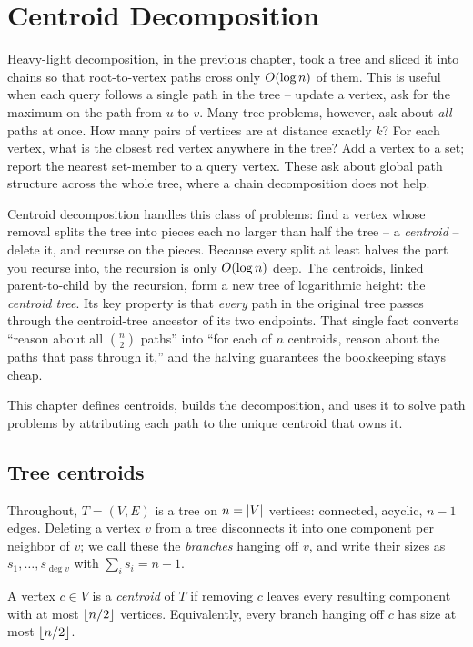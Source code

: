\chapter{Centroid Decomposition}

Heavy-light decomposition, in the previous chapter, took a tree and sliced it into
chains so that root-to-vertex paths cross only $O(\log n)$ of them. This is useful when each query follows a single path in the tree -- update a vertex, ask
for the maximum on the path from $u$ to $v$. Many tree problems, however, ask
about \emph{all} paths at once. How many pairs
of vertices are at distance exactly $k$? For each vertex, what is the closest red
vertex anywhere in the tree? Add a vertex to a set; report the nearest set-member
to a query vertex. These ask about global path structure across the whole tree, where a
chain decomposition does not help.

Centroid decomposition handles this class of problems:
find a vertex whose removal splits the tree into pieces each no larger than half
the tree -- a \emph{centroid} -- delete it, and recurse on the pieces. Because
every split at least halves the part you recurse into, the recursion is only
$O(\log n)$ deep. The centroids, linked parent-to-child by the recursion, form a
new tree of logarithmic height: the \emph{centroid tree}. Its key property is
that \emph{every} path in the original tree passes through the centroid-tree
ancestor of its two endpoints. That single fact converts ``reason about all
$\binom{n}{2}$ paths'' into ``for each of $n$ centroids, reason about the paths
that pass through it,'' and the halving guarantees the bookkeeping stays cheap.

This chapter defines centroids, builds the decomposition, and uses it to solve path problems by attributing each path to the unique centroid that owns it.

\chapterline

\section{Tree centroids}
\label{ch20:centroids}

Throughout, $T=(V,E)$ is a tree on $n=\lvert V\rvert$ vertices: connected, acyclic,
$n-1$ edges. Deleting a vertex $v$ from a tree disconnects it into one component
per neighbor of $v$; we call these the \emph{branches} hanging off $v$, and write
their sizes as $s_1,\dots,s_{\deg v}$ with $\sum_i s_i = n-1$.

\begin{definition}[Centroid]
\label{ch20:def-centroid}
A vertex $c\in V$ is a \emph{centroid} of $T$ if removing $c$ leaves every
resulting component with at most $\lfloor n/2\rfloor$ vertices. Equivalently, every
branch hanging off $c$ has size at most $\lfloor n/2\rfloor$.
\end{definition}

